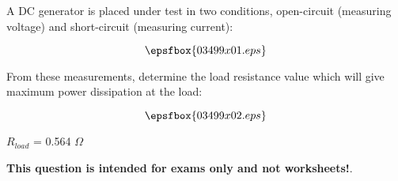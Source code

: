 

A DC generator is placed under test in two conditions, open-circuit (measuring voltage) and short-circuit (measuring current):

$$\epsfbox{03499x01.eps}$$

From these measurements, determine the load resistance value which will give maximum power dissipation at the load:

$$\epsfbox{03499x02.eps}$$







$R_{load}$ = 0.564 $\Omega$







{\bf This question is intended for exams only and not worksheets!}.



